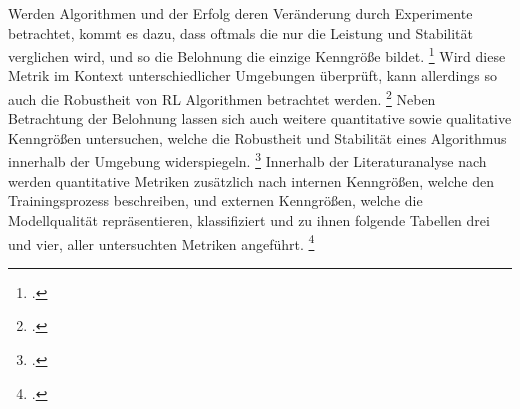 Werden Algorithmen und der Erfolg deren Veränderung durch Experimente betrachtet, kommt es dazu, dass oftmals die nur die Leistung und Stabilität verglichen wird, und so die Belohnung die einzige Kenngröße bildet. \footcite[Vgl.][S. 6]{YanDuan.2016}
Wird diese Metrik im Kontext unterschiedlicher Umgebungen überprüft, kann allerdings so auch die Robustheit von RL Algorithmen betrachtet werden. \footcite[Vgl.][S. 6]{Pinto.2017}
Neben Betrachtung der Belohnung lassen sich auch weitere quantitative sowie qualitative Kenngrößen untersuchen, welche die Robustheit und Stabilität eines Algorithmus innerhalb der Umgebung widerspiegeln. \footcite[Vgl.][S. 15]{Pullum.2022}
Innerhalb der Literaturanalyse nach \cite[]{Pullum.2022} werden quantitative Metriken zusätzlich nach internen Kenngrößen, welche den Trainingsprozess beschreiben, und externen Kenngrößen, welche die Modellqualität repräsentieren, klassifiziert und zu ihnen folgende Tabellen drei und vier, aller untersuchten Metriken angeführt. \footcite[Vgl.][S. 16]{Pullum.2022}

